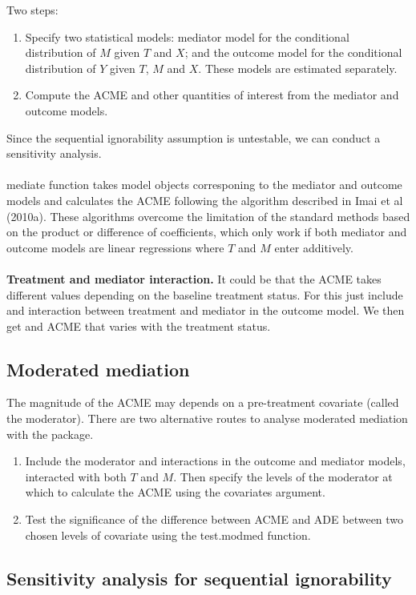 \documentclass{article}
\begin{document}
	Two steps:
	\begin{enumerate}
		\item Specify two statistical models: mediator model for the conditional distribution of $M$ given $T$ and $X$; and the outcome model for the conditional distribution of $Y$ given $T$, $M$ and $X$. These models are estimated separately.
		\item Compute the ACME and other quantities of interest from the mediator and outcome models. 
	\end{enumerate}
	Since the sequential ignorability assumption is untestable, we can conduct a sensitivity analysis. 
	\\~\\
	mediate function takes model objects corresponing to the mediator and outcome models and calculates the ACME following the algorithm described in Imai et al (2010a). These algorithms overcome the limitation of the standard methods based on the product or difference of coefficients, which only work if both mediator and outcome models are linear regressions where $T$ and $M$ enter additively.
	\\~\\
	\textbf{Treatment and mediator interaction.} It could be that the ACME takes different values depending on the baseline treatment status. For this just include and interaction between treatment and mediator in the outcome model. We then get and ACME that varies with the treatment status.
	
	\subsection{Moderated mediation}
	
	The magnitude of the ACME may depends on a pre-treatment covariate (called the moderator). There are two alternative routes to analyse moderated mediation with the package.
	\begin{enumerate}
		\item Include the moderator and interactions in the outcome and mediator models, interacted with both $T$ and $M$. Then specify the levels of the moderator at which to calculate the ACME using the covariates argument. 
		\item Test the significance of the difference between ACME and ADE between two chosen levels of covariate using the test.modmed function. 
	\end{enumerate}
	
	
	\subsection{Sensitivity analysis for sequential ignorability}
	
\end{document}
